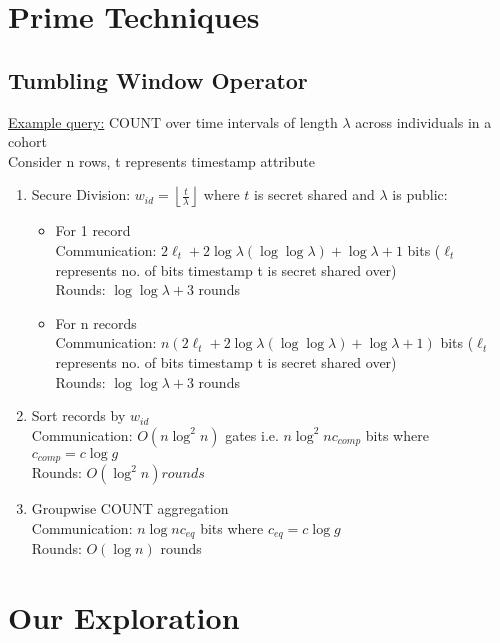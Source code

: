 \documentclass{article}
\begin{document}
\section{Prime Techniques}

\subsection{Tumbling Window Operator}
\underline{Example query:} COUNT over time intervals of length $\lambda$ across individuals in a cohort \\
Consider n rows, t represents timestamp attribute 
\begin{enumerate}
\item Secure Division: $w_{id} = \left\lfloor \frac{t}{\lambda} \right\rfloor$ where $t$ is secret shared and $\lambda$ is public:
\begin{itemize}
\item For 1 record \\
Communication: $2\ell_{t} + 2\log \lambda (\log \log \lambda) + \log \lambda + 1$ bits ($\ell_{t}$ represents no. of bits timestamp t is secret shared over) \\
Rounds: $\log \log \lambda + 3$ rounds
\item For n records \\
Communication: $n(2\ell_{t} + 2\log \lambda (\log \log \lambda) + \log \lambda + 1)$ bits ($\ell_{t}$ represents no. of bits timestamp t is secret shared over) \\
Rounds: $\log \log \lambda + 3$ rounds
\end{itemize}
\item Sort records by $w_{id}$ \\
Communication: $O(n \log^2 n)$ gates i.e. $n \log^2 n c_{comp}$ bits where $c_{comp} = c \log g$ \\
Rounds: $O(\log^2 n) rounds$
\item Groupwise COUNT aggregation  \\
Communication: $n \log n c_{eq}$ bits where $c_{eq} = c \log g$ \\
Rounds: $O(\log n)$ rounds
\end{enumerate}

\section{Our Exploration}
\end{document}
